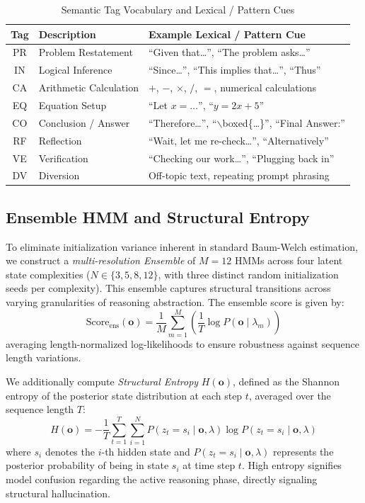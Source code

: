 \documentclass[runningheads]{llncs}
\begin{document}
\begin{table}[t]
\caption{Semantic Tag Vocabulary and Lexical / Pattern Cues}
\label{tab:tags}
\centering
\begin{tabular}{cll}
\toprule
\textbf{Tag} & \textbf{Description} & \textbf{Example Lexical / Pattern Cue}\\
\midrule
PR & Problem Restatement & ``Given that\dots'', ``The problem asks\dots''\\
IN & Logical Inference   & ``Since\dots'', ``This implies that\dots'', ``Thus''\\
CA & Arithmetic Calculation & $+$, $-$, $\times$, $/$, $=$, numerical calculations\\
EQ & Equation Setup      & ``Let $x = \dots$'', ``$y = 2x + 5$''\\
CO & Conclusion / Answer & ``Therefore\dots'', ``$\backslash$boxed\{\dots\}'', ``Final Answer:''\\
RF & Reflection          & ``Wait, let me re-check\dots'', ``Alternatively''\\
VE & Verification        & ``Checking our work\dots'', ``Plugging back in''\\
DV & Diversion           & Off-topic text, repeating prompt phrasing\\
\bottomrule
\end{tabular}
\end{table}

\subsection{Ensemble HMM and Structural Entropy}

To eliminate initialization variance inherent in standard Baum-Welch estimation, we construct a \textit{multi-resolution Ensemble} of $M=12$ HMMs across four latent state complexities ($N \in \{3, 5, 8, 12\}$, with three distinct random initialization seeds per complexity). This ensemble captures structural transitions across varying granularities of reasoning abstraction. The ensemble score is given by:
\begin{equation}
\text{Score}_{\text{ens}}(\mathbf{o}) = \frac{1}{M} \sum_{m=1}^{M} \left( \frac{1}{T} \log P(\mathbf{o} \mid \lambda_m) \right)
\label{eq:ensemble_score}
\end{equation}
averaging length-normalized log-likelihoods to ensure robustness against sequence length variations.

We additionally compute \textit{Structural Entropy} $H(\mathbf{o})$, defined as the Shannon entropy of the posterior state distribution at each step $t$, averaged over the sequence length $T$:
\begin{equation}
H(\mathbf{o}) = -\frac{1}{T} \sum_{t=1}^{T} \sum_{i=1}^{N} P(z_t = s_i \mid \mathbf{o}, \lambda) \log P(z_t = s_i \mid \mathbf{o}, \lambda)
\label{eq:structural_entropy}
\end{equation}
where $s_i$ denotes the $i$-th hidden state and $P(z_t = s_i \mid \mathbf{o}, \lambda)$ represents the posterior probability of being in state $s_i$ at time step $t$. High entropy signifies model confusion regarding the active reasoning phase, directly signaling structural hallucination.
\end{document}
